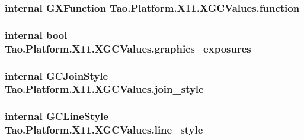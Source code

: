 \label{struct_tao_1_1_platform_1_1_x11_1_1_x_g_c_values_a51460c7b550241e1fcc90ef8cb8fb830}
\hypertarget{struct_tao_1_1_platform_1_1_x11_1_1_x_g_c_values_a60eb1d987559441cd8c8570739a04cc8}{
\subsubsection[{function}]{\setlength{\rightskip}{0pt plus 5cm}internal {\bf GXFunction} {\bf Tao.Platform.X11.XGCValues.function}}}
\label{struct_tao_1_1_platform_1_1_x11_1_1_x_g_c_values_a60eb1d987559441cd8c8570739a04cc8}
\hypertarget{struct_tao_1_1_platform_1_1_x11_1_1_x_g_c_values_a6c5f3da2408aa92c50bff328696370f8}{
\subsubsection[{graphics\_\-exposures}]{\setlength{\rightskip}{0pt plus 5cm}internal bool {\bf Tao.Platform.X11.XGCValues.graphics\_\-exposures}}}
\label{struct_tao_1_1_platform_1_1_x11_1_1_x_g_c_values_a6c5f3da2408aa92c50bff328696370f8}
\hypertarget{struct_tao_1_1_platform_1_1_x11_1_1_x_g_c_values_a4ddbd40fd5659cd802d37bf514aeed8c}{
\subsubsection[{join\_\-style}]{\setlength{\rightskip}{0pt plus 5cm}internal {\bf GCJoinStyle} {\bf Tao.Platform.X11.XGCValues.join\_\-style}}}
\label{struct_tao_1_1_platform_1_1_x11_1_1_x_g_c_values_a4ddbd40fd5659cd802d37bf514aeed8c}
\hypertarget{struct_tao_1_1_platform_1_1_x11_1_1_x_g_c_values_ad7a5ffead4bf997e80679343bfab1bd7}{
\subsubsection[{line\_\-style}]{\setlength{\rightskip}{0pt plus 5cm}internal {\bf GCLineStyle} {\bf Tao.Platform.X11.XGCValues.line\_\-style}}}

